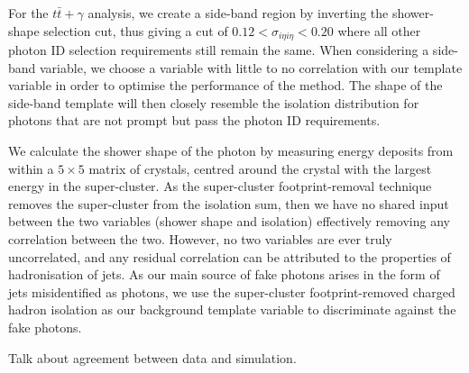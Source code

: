 For the $t\bar{t}+\gamma$ analysis, we create a side-band region by inverting the shower-shape selection cut, thus giving a cut of $0.12 < \sigma_{i \eta i \eta} < 0.20$ where all other photon ID selection requirements still remain the same. When considering a side-band variable, we choose a variable with little to no correlation with our template variable in order to optimise the performance of the method. The shape of the side-band template will then closely resemble the isolation distribution for photons that are not prompt but pass the photon ID requirements. 

We calculate the shower shape of the photon by measuring energy deposits from within a $5 \times 5$ matrix of crystals, centred around the crystal with the largest energy in the super-cluster. As the super-cluster footprint-removal technique removes the super-cluster from the isolation sum, then we have no shared input between the two variables (shower shape and isolation) effectively removing any correlation between the two. However, no two variables are ever truly uncorrelated, and any residual correlation can be attributed to the properties of hadronisation of jets. As our main source of fake photons arises in the form of jets misidentified as photons, we use the super-cluster footprint-removed charged hadron isolation as our background template variable to discriminate against the fake photons.

Talk about agreement between data and simulation. 



